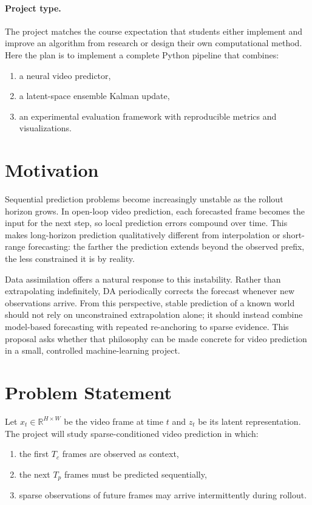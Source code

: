 \documentclass{article}
\begin{document}
\paragraph{Project type.}
The project matches the course expectation that students either implement and improve an algorithm from research or design their own computational method. Here the plan is to implement a complete Python pipeline that combines:
\begin{enumerate}[leftmargin=1.2em]
    \item a neural video predictor,
    \item a latent-space ensemble Kalman update,
    \item an experimental evaluation framework with reproducible metrics and visualizations.
\end{enumerate}

\section{Motivation}

Sequential prediction problems become increasingly unstable as the rollout horizon grows. In open-loop video prediction, each forecasted frame becomes the input for the next step, so local prediction errors compound over time. This makes long-horizon prediction qualitatively different from interpolation or short-range forecasting: the farther the prediction extends beyond the observed prefix, the less constrained it is by reality.

Data assimilation offers a natural response to this instability. Rather than extrapolating indefinitely, DA periodically corrects the forecast whenever new observations arrive. From this perspective, stable prediction of a known world should not rely on unconstrained extrapolation alone; it should instead combine model-based forecasting with repeated re-anchoring to sparse evidence. This proposal asks whether that philosophy can be made concrete for video prediction in a small, controlled machine-learning project.

\section{Problem Statement}

Let $x_t \in \mathbb{R}^{H \times W}$ be the video frame at time $t$ and $z_t$ be its latent representation. The project will study sparse-conditioned video prediction in which:
\begin{enumerate}[leftmargin=1.2em]
    \item the first $T_c$ frames are observed as context,
    \item the next $T_p$ frames must be predicted sequentially,
    \item sparse observations of future frames may arrive intermittently during rollout.
\end{enumerate}
\end{document}
